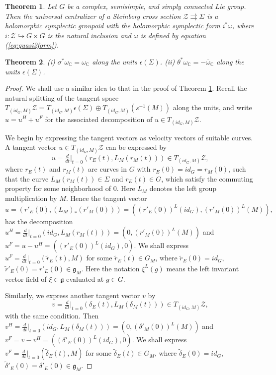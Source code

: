 \documentclass[10pt,a4paper]{amsart}
\newtheorem{thm}{Theorem}
\newcommand{\bC}{\mathbb{C}}
\newcommand{\cZ}{\mathcal{Z}}
\newcommand{\fg}{\mathfrak{g}}
\begin{document}
\begin{thm}\label{thm:universalsymplectic}
Let $G$ be a complex, semisimple, and simply connected Lie group. Then the universal centralizer of a Steinberg cross section $\cZ\rightrightarrows \Sigma$ is a holomorphic symplectic groupoid with the holomorphic symplectic form $i^*\omega$, where $i:\cZ\hookrightarrow G\times G$ is the natural inclusion and $\omega$ is defined by equation (\ref{eq:quasi2form}).
\end{thm}

\begin{thm}\label{thm:main}
(i) $\sigma^*\omega_\bC=\omega_\bC$ along the units $\epsilon(\Sigma)$. (ii) $\theta^*\omega_{\bC}=-\overline{\omega}_\bC$ along the units $\epsilon(\Sigma)$.
\end{thm}

\begin{proof}
We shall use a similar idea to that in the proof of Theorem \ref{thm:universalsymplectic}. Recall the natural splitting of the tangent space $T_{(id_G,M)}\cZ=T_{(id_G,M)}\epsilon(\Sigma)\oplus T_{(id_G,M)}(s^{-1}(M))$ along the units, and write $u=u^H+u^F$ for the associated decomposition of $u\in T_{(id_G,M)}\cZ$.

We begin by expressing the tangent vectors as velocity vectors of suitable curves.
A tangent vector $u\in T_{(id_G,M)}\cZ$ can be expressed by
$$u=\tfrac{d}{dt}|_{t=0}(r_E(t),L_M(r_M(t)))\in T_{(id_G,M)}\cZ,$$
where $r_E(t)$ and $r_M(t)$ are curves in $G$ with $r_E(0)=id_G=r_M(0)$, such that the curve $L_M(r_M(t))\in\Sigma$ and $r_E(t)\in G$, which satisfy the commuting property for some neighborhood of $0$. Here $L_M$ denotes the left group multiplication by $M$. Hence the tangent vector
$$u=(r'_E(0),(L_M)_*(r'_M(0)) )=( (r'_E(0))^L(id_G), (r'_M(0))^L(M) ),$$
has the decomposition $u^H=\frac{d}{dt}|_{t=0}(id_G,L_M(r_M(t)))=(0,(r'_M(0))^L(M))$ and $u^F=u-u^H=( (r'_E(0))^L(id_G),0 )$. We shall express $u^F=\frac{d}{dt}|_{t=0}(\tilde{r}_E(t),M)$ for some $\tilde{r}_E(t)\in G_M$, where $\tilde{r}_E(0)=id_G$, $\tilde{r}'_E(0)=r'_E(0) \in \fg_M$.
Here the notation $\xi^L(g)$ means the left invariant vector field of $\xi\in\fg$ evaluated at $g\in G$.

Similarly, we express another tangent vector $v$ by
$$v=\tfrac{d}{dt}|_{t=0}(\delta_E(t),L_M(\delta_M(t)))\in T_{(id_G,M)}\cZ,$$ with the same condition.
Then $v^H=\frac{d}{dt}|_{t=0}(id_G,L_M(\delta_M(t)))=(0,(\delta'_M(0))^L(M))$ and $v^F=v-v^H=( (\delta'_E(0))^L(id_G),0 )$. We shall express $v^F=\frac{d}{dt}|_{t=0}(\tilde{\delta}_E(t),M)$ for some $\tilde{\delta}_E(t)\in G_M$, where $\tilde{\delta}_E(0)=id_G$, $\tilde{\delta}'_E(0)=\delta'_E(0) \in \fg_M$.


\end{proof}
\end{document}
